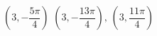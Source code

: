 { $\left( 3, -\dfrac{5\pi}{4} \right)$}
{$\left( 3, -\dfrac{13\pi}{4} \right), \, \left( 3, \dfrac{11\pi}{4} \right)$\\}
